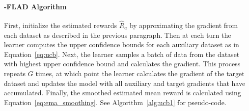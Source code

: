 \paragraph{\ucb{}-FLAD Algorithm}
First, initialize the estimated rewards $\hat{R}_{a}$ by approximating the gradient from each dataset as described in the previous paragraph. Then at each turn the learner computes the upper confidence bounds for each auxiliary dataset as in Equation~\ref{eq:ucb}. Next, the learner samples a batch of data from the dataset with highest upper confidence bound and calculates the gradient.
This process repeats $G$ times, at which point the learner calculates the gradient of the target dataset and updates the model with all auxiliary and target gradients that have accumulated. Finally, the smoothed estimated mean reward is calculated using Equation~\ref{eq:ema_smoothing}. See Algorithm~\ref{alg:ucb1} for pseudo-code.



